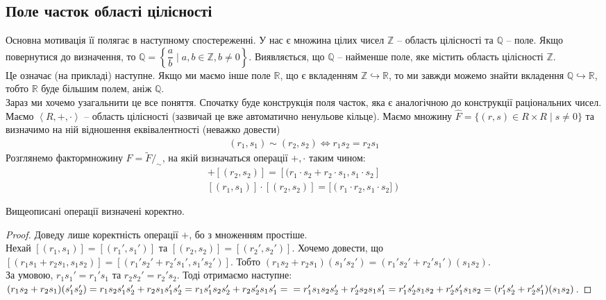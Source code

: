 \documentclass{math_library}
\begin{document}
\subsection{Поле часток області цілісності}
Основна мотивація її полягає в наступному спостереженні. У нас є множина цілих чисел $\mathbb{Z}$ -- область цілісності та $\mathbb{Q}$ -- поле. Якщо повернутися до визначення, то $\mathbb{Q} = \left\{ \dfrac{a}{b} \mid a,b \in \mathbb{Z}, b \neq 0 \right\}$. Виявляється, що $\mathbb{Q}$ -- найменше поле, яке містить область цілісності $\mathbb{Z}$.\\
Це означає (на прикладі) наступне. Якщо ми маємо інше поле $\mathbb{R}$, що є вкладенням $\mathbb{Z} \hookrightarrow \mathbb{R}$, то ми завжди можемо знайти вкладення $\mathbb{Q} \hookrightarrow \mathbb{R}$, тобто $\mathbb{R}$ буде більшим полем, аніж $\mathbb{Q}$.\\
Зараз ми хочемо узагальнити це все поняття. Спочатку буде конструкція поля часток, яка є аналогічною до конструкції раціональних чисел.
\bigskip \\
Маємо $\left<R,+,\cdot\right>$ -- область цілісності (зазвичай це вже автоматично ненульове кільце). Маємо множину $\hat{F} = \{ (r,s) \in R \times R \mid s \neq 0 \}$ та визначимо на ній відношення еквівалентності (неважко довести)
\begin{align*}
(r_1,s_1) \sim (r_2,s_2) \iff r_1 s_2 = r_2 s_1
\end{align*}
Розглянемо фактормножину $F = \tilde{F}/_{\sim}$, на якій визначаться операції $+,\cdot$ таким чином:
\begin{align*}
[(r_1,s_1)] + [(r_2,s_2)] = [(r_1 \cdot s_2 + r_2 \cdot s_1, s_1 \cdot s_2] \\
[(r_1,s_1)] \cdot [(r_2,s_2)] = [(r_1 \cdot r_2, s_1 \cdot s_2])
\end{align*}

\begin{proposition}
Вищеописані операції визначені коректно.
\end{proposition}

\begin{proof}
Доведу лише коректність операції $+$, бо з множенням простіше.\\
Нехай $[(r_1,s_1)] = [(r_1',s_1')]$ та $[(r_2,s_2)] = [(r_2',s_2')]$. Хочемо довести, що \\ $[(r_1s_1 + r_2s_1, s_1s_2)] = [(r_1's_2' + r_2's_1', s_1's_2')]$. Тобто $(r_1 s_2 + r_2 s_1)(s_1' s_2') = (r_1' s_2' + r_2's_1') (s_1s_2)$.\\
За умовою, $r_1s_1' = r_1's_1$ та $r_2s_2' = r_2' s_2$. Тоді отримаємо наступне:\\
$(r_1 s_2 + r_2 s_1) (s_1' s_2') = r_1 s_2 s_1' s_2' + r_2 s_1 s_1' s_2' = r_1 s_1' s_2 s_2' + r_2 s_2' s_1 s_1' = \\
= r_1' s_1 s_2 s_2' + r_2' s_2 s_1 s_1' = r_1' s_2' s_1 s_2 + r_2' s_1' s_1 s_2 = (r_1' s_2' + r_2' s_1') (s_1 s_2)$.
\end{proof}
\end{document}

